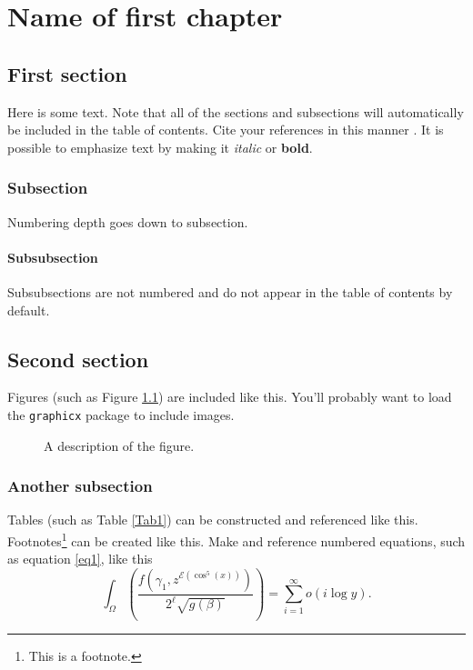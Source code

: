 \chapter{Name of first chapter}

\section{First section}

Here is some text. Note that all of the sections and subsections will automatically be included in the table of contents. Cite your references in this manner \cite{anybody}. It is possible to emphasize text by making it \emph{italic} or \textbf{bold}.

\subsection{Subsection}

Numbering depth goes down to subsection. 

\subsubsection{Subsubsection}
Subsubsections are not numbered and do not appear in the table of contents by default. 


\section{Second section}

Figures (such as Figure \ref{Fig1}) are included like this. You'll probably want to load the \verb!graphicx! package to include images.

\begin{figure}[h]
 \caption{A description of the figure.}
 \label{Fig1}
\end{figure}


\subsection{Another subsection}

Tables (such as Table \ref{Tab1}) can be constructed and referenced like this. Footnotes\footnote{This is a footnote.} can be created like this. Make and reference numbered equations, such as equation \eqref{eq1}, like this
\begin{equation}
 \label{eq1}
 \int_{\Omega} \left(\frac{f(\gamma_1,z^{\mathcal{E}(\cos^5(x))})}{2^\ell\sqrt{g(\beta)}}\right)=\sum_{i=1}^\infty o(i\log y).
\end{equation}

